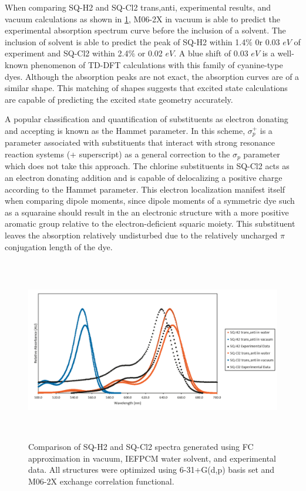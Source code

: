 \documentclass[journal=jacsat,manuscript=article]{achemso}
\begin{document}
When comparing SQ-H2 and SQ-Cl2 trans,anti, experimental results, and vacuum calculations as shown in \ref{fig:SQ1 and SQ4}, M06-2X in vacuum is able to predict the experimental absorption spectrum curve before the inclusion of a solvent. The inclusion of solvent is able to predict the peak of SQ-H2 within 1.4$\%$ 0r 0.03 $eV$ of experiment and SQ-Cl2 within 2.4$\%$ or 0.02 $eV$. A blue shift of 0.03 $eV$ is a well-known phenomenon of TD-DFT calculations with this family of cyanine-type dyes\cite{Jacquemin2011Excited-stateEnvironments}. Although the absorption peaks are not exact, the absorption curves are of a similar shape. This matching of shapes suggests that excited state calculations are capable of predicting the excited state geometry accurately. 

A popular classification and quantification of substituents as electron donating and accepting is known as the Hammet parameter\cite{Hansch1991AParameters}. In this scheme, $\sigma_{p}^{+}$ is a parameter associated with substituents that interact with strong resonance reaction systems (+ superscript) as a general correction to the $\sigma_{p}$ parameter which does not take this approach. The chlorine substituents in SQ-Cl2 acts as an electron donating addition and is capable of delocalizing a positive charge according to the Hammet parameter. This electron localization manifest itself when comparing dipole moments, since dipole moments of a symmetric dye such as a squaraine should result in the an electronic structure with a more positive aromatic group relative to the electron-deficient squaric moiety. This substituent leaves the absorption relatively undisturbed due to the relatively uncharged $\pi$ conjugation length of the dye\cite{Punitharasu2019-ExtendedResponse}.


\begin{figure}[h]
    \centering
    \includegraphics[width=15cm,height=8cm]{figures/sq1-sq4.png}
    \caption{Comparison of  SQ-H2 and SQ-Cl2 spectra generated using FC approximation in vacuum, IEFPCM water solvent, and experimental data. All structures were optimized using 6-31+G(d,p) basis set and M06-2X exchange correlation functional.}
    \label{fig:SQ1 and SQ4}
\end{figure}
\end{document}

